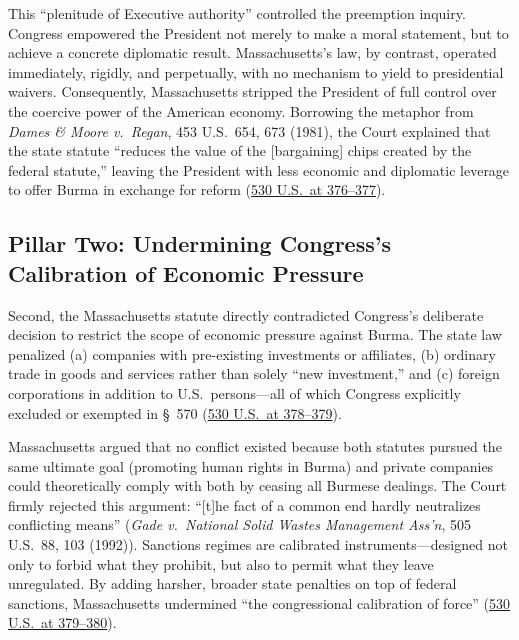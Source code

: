 \documentclass[12pt]{article}
\begin{document}
This ``plenitude of Executive authority'' controlled the preemption inquiry. Congress empowered the President not merely to make a moral statement, but to achieve a concrete diplomatic result. Massachusetts's law, by contrast, operated immediately, rigidly, and perpetually, with no mechanism to yield to presidential waivers. Consequently, Massachusetts stripped the President of full control over the coercive power of the American economy. Borrowing the metaphor from \textit{Dames \& Moore v.\ Regan}, 453 U.S.\ 654, 673 (1981), the Court explained that the state statute ``reduces the value of the [bargaining] chips created by the federal statute,'' leaving the President with less economic and diplomatic leverage to offer Burma in exchange for reform (\href{https://caselaw.findlaw.com/court/us-supreme-court/530/363.html}{530 U.S.\ at 376--377}).

\subsection{Pillar Two: Undermining Congress's Calibration of Economic Pressure}
Second, the Massachusetts statute directly contradicted Congress's deliberate decision to restrict the scope of economic pressure against Burma. The state law penalized (a) companies with pre-existing investments or affiliates, (b) ordinary trade in goods and services rather than solely ``new investment,'' and (c) foreign corporations in addition to U.S.\ persons---all of which Congress explicitly excluded or exempted in \S~570 (\href{https://supreme.justia.com/cases/federal/us/530/363/}{530 U.S.\ at 378--379}).

Massachusetts argued that no conflict existed because both statutes pursued the same ultimate goal (promoting human rights in Burma) and private companies could theoretically comply with both by ceasing all Burmese dealings. The Court firmly rejected this argument: ``[t]he fact of a common end hardly neutralizes conflicting means'' (\textit{Gade v.\ National Solid Wastes Management Ass'n}, 505 U.S.\ 88, 103 (1992)). Sanctions regimes are calibrated instruments---designed not only to forbid what they prohibit, but also to permit what they leave unregulated. By adding harsher, broader state penalties on top of federal sanctions, Massachusetts undermined ``the congressional calibration of force'' (\href{https://supreme.justia.com/cases/federal/us/530/363/}{530 U.S.\ at 379--380}).
\end{document}
